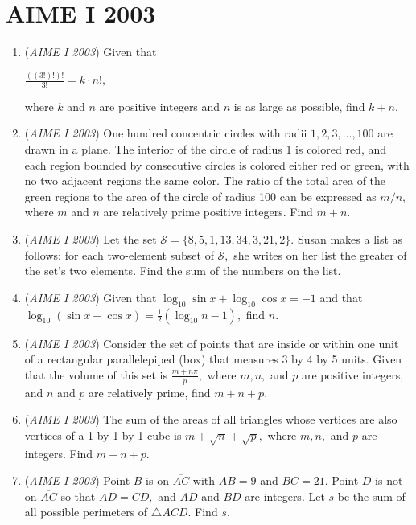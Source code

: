 \section{AIME I 2003}
        \begin{enumerate}
        	\item (\textit{AIME I 2003}) Given that


 $\frac{((3!)!)!}{3!} = k \cdot n!,$

 where $k$ and $n$ are positive integers and $n$ is as large as possible, find $k + n.$


	\item (\textit{AIME I 2003}) One hundred concentric circles with radii $1, 2, 3, \dots, 100$ are drawn in a plane. The interior of the circle of radius 1 is colored red, and each region bounded by consecutive circles is colored either red or green, with no two adjacent regions the same color. The ratio of the total area of the green regions to the area of the circle of radius 100 can be expressed as $m/n,$ where $m$ and $n$ are relatively prime positive integers. Find $m + n.$


	\item (\textit{AIME I 2003}) Let the set $\mathcal{S} = \{8, 5, 1, 13, 34, 3, 21, 2\}.$ Susan makes a list as follows: for each two-element subset of $\mathcal{S},$ she writes on her list the greater of the set's two elements. Find the sum of the numbers on the list.


 

	\item (\textit{AIME I 2003}) Given that $\log_{10} \sin x + \log_{10} \cos x = -1$ and that $\log_{10} (\sin x + \cos x) = \frac{1}{2} (\log_{10} n - 1),$ find $n.$


	\item (\textit{AIME I 2003}) Consider the set of points that are inside or within one unit of a rectangular parallelepiped (box) that measures 3 by 4 by 5 units. Given that the volume of this set is $\frac{m + n \pi}{p},$ where $m, n,$ and $p$ are positive integers, and $n$ and $p$ are relatively prime, find $m + n + p.$


	\item (\textit{AIME I 2003}) The sum of the areas of all triangles whose vertices are also vertices of a 1 by 1 by 1 cube is $m + \sqrt{n} + \sqrt{p},$ where $m, n,$ and $p$ are integers. Find $m + n + p.$


	\item (\textit{AIME I 2003}) Point $B$ is on $\overline{AC}$ with $AB = 9$ and $BC = 21.$ Point $D$ is not on $\overline{AC}$ so that $AD = CD,$ and $AD$ and $BD$ are integers. Let $s$ be the sum of all possible perimeters of $\triangle ACD.$ Find $s.$



\end{enumerate}
